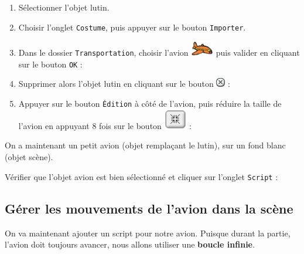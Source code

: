 \begin{enumerate}
\item Sélectionner l'objet lutin.
\item Choisir l'onglet \texttt{Costume}, puis appuyer sur le bouton \texttt{Importer}.
\item Dans le dossier \texttt{Transportation}, choisir l'avion \includegraphics[width=1cm]{./images/scratch/Avion} puis valider en cliquant sur le bouton \texttt{OK} :
\item Supprimer alors l'objet lutin en cliquant sur le bouton \includegraphics[width=.7cm]{./images/scratch/Supprimer} :
\item Appuyer sur le bouton \texttt{Édition} à côté de l'avion, puis réduire la taille de l'avion en appuyant 8 fois sur le bouton \includegraphics[width=1cm]{./images/scratch/Reduire} :
\end{enumerate}
On a maintenant un petit avion (objet remplaçant le lutin), sur un fond blanc (objet scène).

Vérifier que l'objet avion est bien sélectionné et cliquer sur l'onglet \texttt{Script} :







\subsection{Gérer les mouvements de l'avion dans la scène}  

On va maintenant ajouter un script pour notre avion. Puisque durant la partie, l'avion doit toujours avancer, nous allons utiliser une \textbf{boucle infinie}.

\vspace{12pt}

